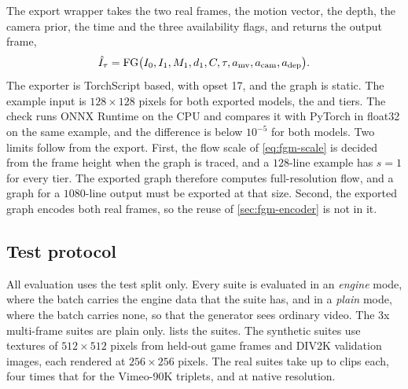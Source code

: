 The export wrapper takes the two real frames, the motion vector, the depth, the camera prior, the time and the three availability flags, and returns the output frame,
\begin{equation}
\hat I_\tau=\mathrm{FG}\big(I_0,I_1,M_1,d_1,C,\tau,a_{\rm mv},a_{\rm cam},a_{\rm dep}\big).\label{eq:fgm-export}
\end{equation}
The exporter is TorchScript based, with opset 17, and the graph is static. The example input is $128\times128$ pixels for both exported models, the  and  tiers. The check runs ONNX Runtime on the CPU and compares it with PyTorch in float32 on the same example, and the difference is below $10^{-5}$ for both models. Two limits follow from the export. First, the flow scale of \cref{eq:fgm-scale} is decided from the frame height when the graph is traced, and a $128$-line example has $s=1$ for every tier. The exported graph therefore computes full-resolution flow, and a graph for a $1080$-line output must be exported at that size. Second, the exported graph encodes both real frames, so the reuse of \cref{sec:fgm-encoder} is not in it.

\subsection{Test protocol}\label{sec:fgm-test}

All evaluation uses the test split only. Every suite is evaluated in an \emph{engine} mode, where the batch carries the engine data that the suite has, and in a \emph{plain} mode, where the batch carries none, so that the generator sees ordinary video. The 3x multi-frame suites are plain only.  lists the suites. The synthetic suites use  textures of $512\times512$ pixels from held-out game frames and DIV2K validation images, each rendered at $256\times256$ pixels. The real suites take up to  clips each, four times that for the Vimeo-90K triplets, and  at native resolution.


